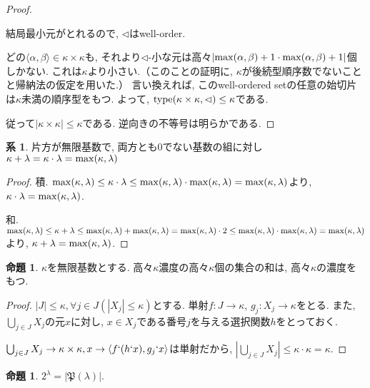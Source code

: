 \documentclass[a4paper, twoside]{bxjsarticle}
\newcommand{\abs}[1]{\left\lvert#1\right\rvert}
\theoremstyle{definition}
\newtheorem{prop}[thm]{命題}
\newtheorem{cor}[thm]{系}
\begin{document}
\begin{proof}
\begin{framed}
                結局最小元がとれるので, $\lhd$はwell-order.
            \end{framed}
            
            どの$\langle \alpha, \beta\rangle\in \kappa\times\kappa$も, それより$\lhd$-小な元は高々$\abs{{\rm max}(\alpha, \beta)+1\cdot{\rm max}(\alpha, \beta)+1}$個しかない. これは$\kappa$より小さい.（このことの証明に, $\kappa$が後続型順序数でないことと帰納法の仮定を用いた.） 言い換えれば, このwell-ordered setの任意の始切片は$\kappa$未満の順序型をもつ. よって, ${\rm type}(\kappa\times\kappa, \lhd)\leq\kappa$である. 
            
            従って$\abs{\kappa\times\kappa}\leq\kappa$である. 逆向きの不等号は明らかである.
        \end{proof}
        \begin{cor}
            片方が無限基数で, 両方とも$0$でない基数の組に対し$\kappa+\lambda=\kappa\cdot\lambda={\rm max}(\kappa, \lambda)$
        \end{cor}
        \begin{proof}
            積. ${\rm max}(\kappa, \lambda)\leq\kappa\cdot\lambda\leq{\rm max}(\kappa, \lambda)\cdot{\rm max}(\kappa, \lambda)={\rm max}(\kappa, \lambda)$より, $\kappa\cdot\lambda={\rm max}(\kappa, \lambda)$.
            
            和. ${\rm max}(\kappa, \lambda)\leq\kappa+\lambda\leq{\rm max}(\kappa, \lambda)+{\rm max}(\kappa, \lambda)={\rm max}(\kappa, \lambda)\cdot 2\leq{\rm max}(\kappa, \lambda)\cdot{\rm max}(\kappa, \lambda)={\rm max}(\kappa, \lambda)$より, $\kappa+\lambda={\rm max}(\kappa, \lambda)$.
        \end{proof}
        \begin{prop}\label{cardlem}
            $\kappa$を無限基数とする. 高々$\kappa$濃度の高々$\kappa$個の集合の和は, 高々$\kappa$の濃度をもつ.
        \end{prop}
        \begin{proof}
            $\abs{J}\leq\kappa, \forall j\in J(\abs{X_j}\leq\kappa)$とする. 単射$f\colon J\to \kappa$, $g_j\colon X_j\to \kappa$をとる. また, $\bigcup_{j\in J}X_j$の元$x$に対し, $x\in X_j$である番号$j$を与える選択関数$h$をとっておく.
            
            $\bigcup_{j\in J}X_j\to \kappa\times\kappa, x\to \langle f`(h`x), g_j`x\rangle$は単射だから, $\abs{\bigcup_{j\in J}X_j}\leq\kappa\cdot\kappa=\kappa$.
        \end{proof}
        \begin{prop}
            $2^\lambda=\abs{\mathfrak{P}(\lambda)}$.
        \end{prop}
\end{document}
